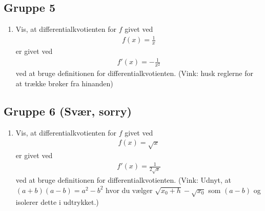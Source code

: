\subsection*{Gruppe 5}
\begin{enumerate}[label=\roman*)]
	\item Vis, at differentialkvotienten for $f$ givet ved
	\begin{align*}
		f(x) = \frac{1}{x}
	\end{align*}
	er givet ved
	\begin{align*}
		f'(x) = -\frac{1}{x^2}
	\end{align*}
	ved at bruge definitionen for differentialkvotienten. (Vink: husk reglerne for at trække brøker 
	fra hinanden)
\end{enumerate}

\subsection*{Gruppe 6 (Svær, sorry)}
\begin{enumerate}[label=\roman*)]
	\item Vis, at differentialkvotienten for $f$ givet ved
	\begin{align*}
		f(x) = \sqrt{x}
	\end{align*}
	er givet ved
	\begin{align*}
		f'(x) = \frac{1}{2\sqrt{x}}
	\end{align*}
	ved at bruge definitionen for differentialkvotienten. (Vink: Udnyt, at $(a+b)(a-b) = a^2 - b^2$ hvor du 
	vælger $\sqrt{x_0 + h} -\sqrt{x_0}$ som $(a-b)$ og isolerer dette i udtrykket.)
\end{enumerate}
